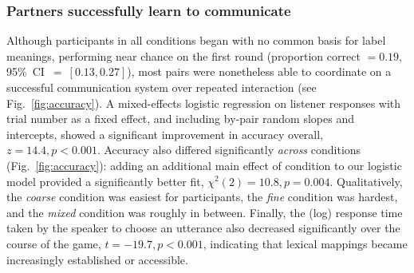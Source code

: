 \documentclass[10pt,letterpaper]{article}
\begin{document}
\subsubsection{Partners successfully learn to communicate}

Although participants in all conditions began with no common basis for label meanings, performing near chance on the first round (proportion correct $= 0.19$, 95\%~CI~$=~[0.13, 0.27]$), most pairs were nonetheless able to coordinate on a successful communication system over repeated interaction (see Fig.\ \ref{fig:accuracy}). 
A mixed-effects logistic regression on listener responses with trial number as a fixed effect, and including by-pair random slopes and intercepts, showed a significant improvement in accuracy overall, $z = 14.4, p < 0.001$. 
Accuracy also differed significantly \emph{across} conditions (Fig.\ \ref{fig:accuracy}): adding an additional main effect of condition to our logistic model provided a significantly better fit, $\chi^2(2) = 10.8, p = 0.004$. 
Qualitatively, the \emph{coarse} condition was easiest for participants, the \emph{fine} condition was hardest, and the \emph{mixed} condition was roughly in between. %
Finally, the (log) response time taken by the speaker to choose an utterance also decreased significantly over the course of the game, $t = -19.7, p < 0.001$, indicating that lexical mappings became increasingly established or accessible.
\end{document}
